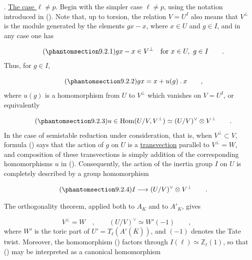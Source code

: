 
\medskip
\noindent
{}. \underline{The case $\ell\neq p$}. Begin with the simpler case
$\ell\neq p$, using the notation introduced in (). Note that,
up to torsion, the relation $V=U^I$ also means that $V^{\perp}$ is
the module generated by the elements $gx-x$, where $x\in U$ and
$g\in I$, and in any case one has

\begin{equation}\tag{\SGARefTarget{sga7.sga7i.eix.n9-2-1}{9.2.1}}
gx-x\in V^{\perp}\quad\text{for }x\in U,\ g\in I \qquad .
\end{equation}
Thus, for $g\in I$,

\begin{equation}\tag{\SGARefTarget{sga7.sga7i.eix.n9-2-2}{9.2.2}}
gx=x+u(g)\mathbin{.}x \qquad ,
\end{equation}
where $u(g)$ is a homomorphism from $U$ to
$V^{\perp}$ which vanishes on $V=U^I$, or equivalently

\begin{equation}\tag{\SGARefTarget{sga7.sga7i.eix.n9-2-3}{9.2.3}}
u\in\operatorname{Hom}(U/V,V^{\perp})
 \simeq (U/V)^{\vee}\otimes V^{\perp} \qquad .
\end{equation}
In the case of semistable reduction under consideration, that is,
when $V^{\perp}\subset V$, formula () says that the action of
$g$ on $U$ is a \underline{transvection} parallel to
$V^{\perp}=W$, and composition of these transvections is simply
addition of the corresponding homomorphisms $u$ in ().
Consequently, the action of the inertia group $I$ on $U$ is
completely described by a group homomorphism

\begin{equation}\tag{\SGARefTarget{sga7.sga7i.eix.n9-2-4}{9.2.4}}
I\longrightarrow (U/V)^{\vee}\otimes V^{\perp} \qquad .
\end{equation}

The orthogonality theorem, applied both to $A_K$ and to $A'_K$,
gives

\begin{equation*}
V^{\perp}=W \quad , \qquad
(U/V)^{\vee}\simeq W'(-1) \qquad ,
\end{equation*}
where $W'$ is the toric part of
$U'=T_{\ell}(A'(\overline K))$, and $(-1)$ denotes the Tate twist.
Moreover, the homomorphism () factors through
$I(\ell)\simeq\mathbb{Z}_{\ell}(1)$, so that () may be
interpreted as a canonical homomorphism

